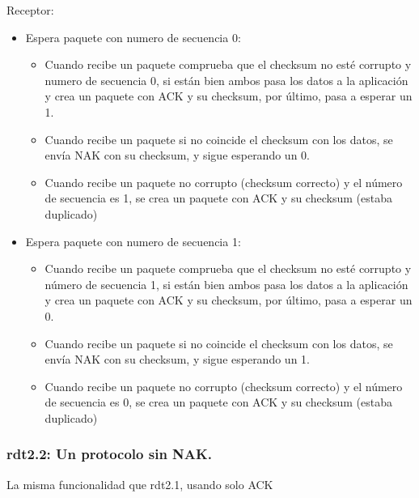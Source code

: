 \documentclass[12pt, twoside, openright]{report} %
\begin{document}
\pagebreak
Receptor:
\begin{figure}[H]
	{\def\svgwidth{1.1\textwidth}
		}
\end{figure}
\begin{itemize}
	\item Espera paquete con numero de secuencia 0:

	      \begin{itemize}
		      \item Cuando recibe un paquete comprueba que el checksum no esté
		            corrupto y numero de secuencia 0, si están bien ambos pasa los
		            datos a la aplicación y crea un paquete con ACK y su checksum,
		            por último, pasa a esperar un 1.
		      \item Cuando recibe un paquete si no coincide el checksum con los
		            datos, se envía NAK con su checksum, y sigue esperando un 0.
		      \item Cuando recibe un paquete no corrupto (checksum correcto) y el
		            número de secuencia es 1, se crea un paquete con ACK y su
		            checksum (estaba duplicado)
	      \end{itemize}
	\item Espera paquete con numero de secuencia 1:

	      \begin{itemize}
		      \item Cuando recibe un paquete comprueba que el checksum no esté
		            corrupto y número de secuencia 1, si están bien ambos pasa los
		            datos a la aplicación y crea un paquete con ACK y su checksum,
		            por último, pasa a esperar un 0.
		      \item Cuando recibe un paquete si no coincide el checksum con los
		            datos, se envía NAK con su checksum, y sigue esperando un 1.
		      \item Cuando recibe un paquete no corrupto (checksum correcto) y el
		            número de secuencia es 0, se crea un paquete con ACK y su
		            checksum (estaba duplicado)
	      \end{itemize}
\end{itemize}
\pagebreak
\subsubsection{rdt2.2: Un protocolo sin NAK.}


La misma funcionalidad que rdt2.1, usando solo ACK
\end{document}
